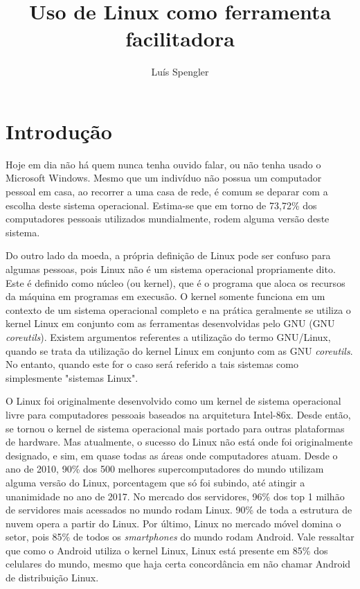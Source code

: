\documentclass{article}
\title{Uso de Linux como ferramenta facilitadora}
\date{}
\author[1]{Luís Spengler}
\affil[1]{Instituto Federal de Educação, Ciência e Tecnologia de Mato Grosso do Sul}
\begin{document}
\maketitle

\tableofcontents

\medskip

\section{Introdução}
Hoje em dia não há quem nunca tenha ouvido falar, ou não tenha usado o Microsoft Windows. Mesmo que um indivíduo não possua um computador pessoal em casa, ao recorrer a uma casa de rede, é comum se deparar com a escolha deste sistema operacional. Estima-se que em torno de 73,72\% dos computadores pessoais utilizados mundialmente, rodem alguma versão deste sistema. \cite{statista1}

Do outro lado da moeda, a própria definição de Linux pode ser confuso para algumas pessoas, pois Linux não é um sistema operacional propriamente dito. Este é definido como núcleo (ou kernel), que é o programa que aloca os recursos da máquina em programas em execusão. O kernel somente funciona em um contexto de um sistema operacional completo e na prática geralmente se utiliza o kernel Linux em conjunto com as ferramentas desenvolvidas pelo GNU (GNU \textit{coreutils}). Existem argumentos referentes a utilização do termo GNU/Linux, quando se trata da utilização do kernel Linux em conjunto com as GNU \textit{coreutils}. \cite{GNU} No entanto, quando este for o caso será referido a tais sistemas como simplesmente "sistemas Linux".

O Linux foi originalmente desenvolvido como um kernel de sistema operacional livre para computadores pessoais baseados na arquitetura Intel-86x. Desde então, se tornou o kernel de sistema operacional mais portado para outras plataformas de hardware. \cite{garrels} Mas atualmente, o sucesso do Linux não está onde foi originalmente designado, e sim, em quase todas as áreas onde computadores atuam. Desde o ano de 2010, 90\% dos 500 melhores supercomputadores do mundo utilizam alguma versão do Linux, porcentagem que só foi subindo, até atingir a unanimidade no ano de 2017. \cite{top500}  No mercado dos servidores, 96\% dos top 1 milhão de servidores mais acessados no mundo rodam Linux. 90\% de toda a estrutura de nuvem opera a partir do Linux. Por último, Linux no mercado móvel domina o setor, pois 85\% de todos os \textit{smartphones} do mundo rodam Android. \cite{LF} Vale ressaltar que como o Android utiliza o kernel Linux, Linux está presente em 85\% dos celulares do mundo, mesmo que haja certa concordância em não chamar Android de distribuição Linux. \cite{arstechnica}
\end{document}
